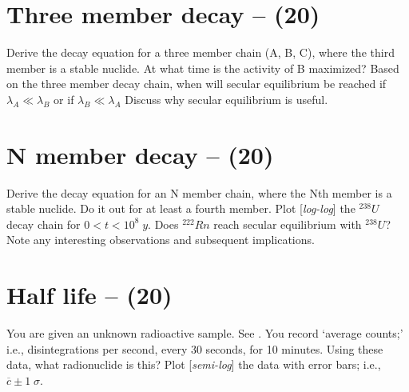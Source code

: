 \documentclass[11pt,a4paper]{article}
\begin{document}
\newpage


\section{Three member decay -- (20)}
Derive the decay equation for a three member chain (A, B, C), where the third member is a stable nuclide. At what time is the activity of B maximized? Based on the three member decay chain, when will secular equilibrium be reached if $\lambda_A \ll \lambda_B$ or if $\lambda_B \ll \lambda_A$ Discuss why secular equilibrium is useful.





\newpage


\section{N member decay -- (20)}
Derive the decay equation for an N member chain, where the Nth member is a stable nuclide. Do it out for at least a fourth member. Plot [\textit{log-log}] the $^{238}U$ decay chain for $0<t<10^8\;y$. Does $^{222}Rn$ reach secular equilibrium with $^{238}U$? Note any interesting observations and subsequent implications.
        
        
        
        
        
\newpage


\section{Half life -- (20)} 
You are given an unknown radioactive sample. See . You record `average counts;' i.e., disintegrations per second, every 30 seconds, for 10 minutes. Using these data, what radionuclide is this? Plot [\textit{semi-log}] the data with error bars; i.e., $\overline{c} \pm 1 \; \sigma$.
        




\newpage


\pagestyle{fancyplain}
\fancyhf{} %
\renewcommand{\headrulewidth}{0pt} %
\rfoot{\fancyplain{}{\thepage}}
\nolinenumbers


%
%

\setlength{\bibhang}{0pt}

%
\end{document}
